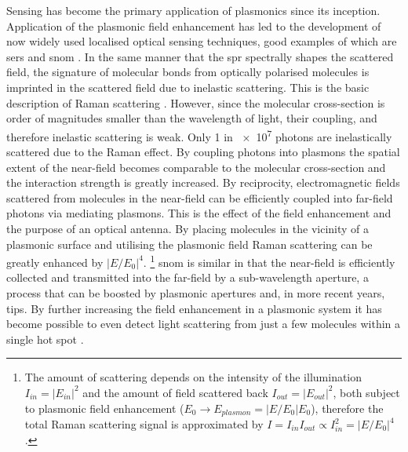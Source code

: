 \documentclass[12pt, a4paper, twoside]{book}
\begin{document}
Sensing has become the primary application of plasmonics since its inception. Application of the plasmonic field enhancement has led to the development of now widely used localised optical sensing techniques, good examples of which are \gls{sers} \cite{fleischmann1974, jeanmaire1977} and \gls{snom} \cite{ash1972super, pohl1984optical, lewis1984development, pohl1986optical, harootunian1986super, betzig1988near}. In the same manner that the \gls{spr} spectrally shapes the scattered field, the signature of molecular bonds from optically polarised molecules is imprinted in the scattered field due to inelastic scattering. This is the basic description of Raman scattering \cite{raman1928}. However, since the molecular cross-section is order of magnitudes smaller than the wavelength of light, their coupling, and therefore inelastic scattering is weak. Only 1 in \num{e7} photons are inelastically scattered due to the Raman effect. By coupling photons into plasmons the spatial extent of the near-field becomes comparable to the molecular cross-section and the interaction strength is greatly increased. By reciprocity, electromagnetic fields scattered from molecules in the near-field can be efficiently coupled into far-field photons via mediating plasmons. This is the effect of the field enhancement and the purpose of an optical antenna. By placing molecules in the vicinity of a plasmonic surface and utilising the plasmonic field Raman scattering can be greatly enhanced by $\left|E/E_0\right|^4$.%
\footnote{The amount of scattering depends on the intensity of the illumination $I_{in}=|E_{in}|^2$ and the amount of field scattered back $I_{out} = |E_{out}|^2$, both subject to plasmonic field enhancement ($E_0\rightarrow E_{plasmon} = |E/E_0| E_0$), therefore the total Raman scattering signal is approximated by $I = I_{in}I_{out} \propto I_{in}^2 = |E/E_0|^4$.}
\Gls{snom} is similar in that the near-field is efficiently collected and transmitted into the far-field by a sub-wavelength aperture, a process that can be boosted by plasmonic apertures and, in more recent years, tips. By further increasing the field enhancement in a plasmonic system it has become possible to even detect light scattering from just a few molecules within a single hot spot \cite{zhang2013}.
\end{document}

